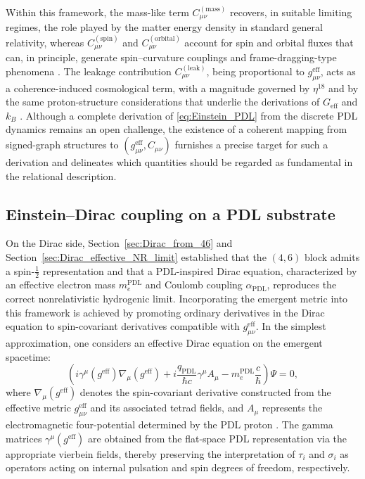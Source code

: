\documentclass[11pt,a4paper]{article}
\theoremstyle{definition}
\newcommand{\PDL}{\mathrm{PDL}}
\newcommand{\Geff}{G_{\mathrm{eff}}}
\newcommand{\alphaPDL}{\alpha_{\mathrm{PDL}}}
\newcommand{\etaL}{\eta} %
\newcommand{\Ccoh}{C_{\mu\nu}} %
\begin{document}
Within this framework, the mass-like term $C_{\mu\nu}^{(\mathrm{mass})}$ recovers, in suitable limiting regimes, the role played by the matter energy density in standard general relativity, whereas $C_{\mu\nu}^{(\mathrm{spin})}$ and $C_{\mu\nu}^{(\mathrm{orbital})}$ account for spin and orbital fluxes that can, in principle, generate spin–curvature couplings and frame-dragging-type phenomena \cite{PDL_Global_Mapping_Structures_Results_Open_Problems}. The leakage contribution $C_{\mu\nu}^{(\mathrm{leak})}$, being proportional to $g_{\mu\nu}^{\mathrm{eff}}$, acts as a coherence-induced cosmological term, with a magnitude governed by $\etaL^{18}$ and by the same proton-structure considerations that underlie the derivations of $\Geff$ and $k_B$ \cite{A_Topological_Reformulation_in_the_Projective_Dynamic_Logo_Framework_Hierarchical_Coherence_Filtering_and_the_Exponent_18_in_PDL,Hierarchical_Coherence_Filtering_and_the_Exponent_18_in_PDL}. Although a complete derivation of \eqref{eq:Einstein_PDL} from the discrete PDL dynamics remains an open challenge, the existence of a coherent mapping from signed-graph structures to $(g_{\mu\nu}^{\mathrm{eff}},\Ccoh)$ furnishes a precise target for such a derivation and delineates which quantities should be regarded as fundamental in the relational description.

\subsection{Einstein--Dirac coupling on a PDL substrate}

On the Dirac side, Section~\ref{sec:Dirac_from_46} and Section~\ref{sec:Dirac_effective_NR_limit} established that the $(4,6)$ block admits a spin-$\tfrac{1}{2}$ representation and that a PDL-inspired Dirac equation, characterized by an effective electron mass $m_e^{\PDL}$ and Coulomb coupling $\alphaPDL$, reproduces the correct nonrelativistic hydrogenic limit. Incorporating the emergent metric into this framework is achieved by promoting ordinary derivatives in the Dirac equation to spin-covariant derivatives compatible with $g_{\mu\nu}^{\mathrm{eff}}$. In the simplest approximation, one considers an effective Dirac equation on the emergent spacetime:
\begin{equation}
\left(i\gamma^\mu(g^{\mathrm{eff}})\nabla_\mu(g^{\mathrm{eff}}) + i\frac{q_{\PDL}}{\hbar c}\gamma^\mu A_\mu - m_e^{\PDL} \frac{c}{\hbar}\right)\Psi = 0,
\label{eq:Dirac_on_geff}
\end{equation}
where $\nabla_\mu(g^{\mathrm{eff}})$ denotes the spin-covariant derivative constructed from the effective metric $g_{\mu\nu}^{\mathrm{eff}}$ and its associated tetrad fields, and $A_\mu$ represents the electromagnetic four-potential determined by the PDL proton \cite{PDL_Global_Mapping_Structures_Results_Open_Problems,Schodinger_PDL}. The gamma matrices $\gamma^\mu(g^{\mathrm{eff}})$ are obtained from the flat-space PDL representation via the appropriate vierbein fields, thereby preserving the interpretation of $\tau_i$ and $\sigma_i$ as operators acting on internal pulsation and spin degrees of freedom, respectively.
\end{document}
